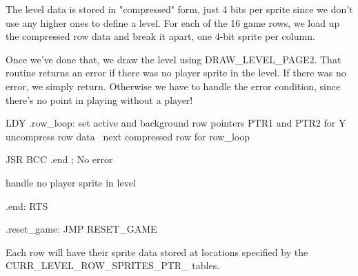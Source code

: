 \documentclass[10pt]{report}
\begin{document}
The level data is stored in "compressed" form, just 4 bits per sprite since we
don't use any higher ones to define a level. For each of the 16 game rows,
we load up the compressed row data and break it apart, one 4-bit sprite per
column.

Once we've done that, we draw the level using {\Tt{}DRAW{\_}LEVEL{\_}PAGE2\nwendquote}. That
routine returns an error if there was no player sprite in the level. If
there was no error, we simply return. Otherwise we have to handle the
error condition, since there's no point in playing without a player!

\nwenddocs{}\endmoddef\nwstartdeflinemarkup{}\nwenddeflinemarkup
    LDY     
.row_loop:
    \LA{}set active and background row pointers \code{}PTR1\edoc{} and \code{}PTR2\edoc{} for \code{}Y\edoc{}~{\nwtagstyle{}}\RA{}
    \LA{}uncompress row data~{\nwtagstyle{}}\RA{}
    \LA{}next compressed row for \code{}row{\_}loop\edoc{}~{\nwtagstyle{}}\RA{}

    JSR     
    BCC     .end                ; No error

\LA{}handle no player sprite in level~{\nwtagstyle{}}\RA{}

.end:
    RTS

.reset_game:
    JMP     RESET_GAME
\nwendcode{}\nwdocspar

Each row will have their sprite data stored at locations specified by
the {\Tt{}CURR{\_}LEVEL{\_}ROW{\_}SPRITES{\_}PTR{\_}\nwendquote} tables.
\end{document}
